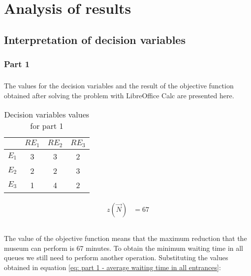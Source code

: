 \chapter{Analysis of results}
\label{chapter: analysis of results}

\section{Interpretation of decision variables}

\subsection{Part 1}

\paragraph{}
The values for the decision variables and the result of the objective function obtained after solving the problem with LibreOffice Calc are presented here.

\begin{table}[H]
    \setlength{\arrayrulewidth}{.1em}
    \centering
    \caption{Decision variables values for part 1}
    \begin{tabular}{cccc}
        \rowcolor{gray!60}
        \hline
        & $RE_1$ & $RE_2$ & $RE_3$\\
        \hline
        $E_1$ & 3 & 3 & 2\\
        $E_2$ & 2 & 2 & 3\\
        $E_3$ & 1 & 4 & 2\\
        \hline
    \end{tabular}
    \label{table: solution part 1 - decision variables}
\end{table}


\begin{equation}
    \begin{aligned}
        z(\vec{N}) & = 67\\
    \end{aligned}
    \label{eq: solution part 1 - objective function}
\end{equation}

\paragraph{}
The value of the objective function means that the maximum reduction that the museum can perform is 67 minutes. To obtain the minimum waiting time in all queues we still need to perform another operation. Substituting the values obtained in equation \ref{eq: part 1 - average waiting time in all entrances}:

